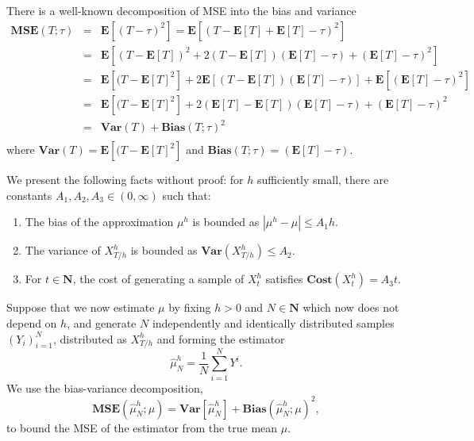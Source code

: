 \documentclass{article}
\begin{document}
There is a well-known decomposition of MSE into the bias and variance
\begin{eqnarray*}
    \mathbf{MSE}(T; \tau) & = & \mathbf{E}[(T - \tau)^2] = \mathbf{E}[(T - \mathbf{E}[T] + \mathbf{E}[T] - \tau)^2] \\
                          & = & \mathbf{E}[(T - \mathbf{E}[T])^2 + 2(T - \mathbf{E}[T])(\mathbf{E}[T] - \tau)  + (\mathbf{E}[T] - \tau)^2] \\
                          & = & \mathbf{E}[(T - \mathbf{E}[T]^2] + 2\mathbf{E}[(T - \mathbf{E}[T])(\mathbf{E}[T] - \tau)]  + \mathbf{E}[(\mathbf{E}[T] - \tau)^2] \\
                          & = & \mathbf{E}[(T - \mathbf{E}[T]^2] + 2(\mathbf{E}[T] - \mathbf{E}[T])(\mathbf{E}[T] - \tau)  + (\mathbf{E}[T] - \tau)^2 \\
                          & = & \mathbf{Var}(T) + \mathbf{Bias}(T; \tau)^2 \\
\end{eqnarray*}
where \(\mathbf{Var}(T) = \mathbf{E}[(T - \mathbf{E}[T]^2]\) and \(\mathbf{Bias}(T; \tau) = (\mathbf{E}[T] - \tau) \).

We present the following facts without proof: for \(h\) sufficiently small, there are constants \(A_1, A_2, A_3 \in (0, \infty)\) such that:
\begin{enumerate}
    \item The bias of the approximation \(\mu^h\) is bounded as \(|\mu^h - \mu| \leq A_1h\).
    \item The variance of \(X^h_{T/h}\) is bounded as \(\mathbf{Var}(X^h_{T/h}) \leq A_2\).
    \item For \(t \in \mathbf{N}\), the cost of generating a sample of \(X^h_t\) satisfies \(\mathbf{Cost}(X^h_t) = A_3t\).
\end{enumerate}

Suppose that we now estimate \(\mu\) by fixing \(h > 0\) and \(N \in \mathbf{N}\) which now does not depend on \(h\), and generate \(N\) independently and identically distributed samples \((Y_i)_{i=1}^N\), distributed as \(X^h_{T/h}\) and forming the estimator
\[ \hat\mu^h_N = \frac{1}{N}\sum_{i=1}^N Y^i. \]
We use the bias-variance decomposition,
\[ \mathbf{MSE}(\hat\mu^h_N; \mu) = \mathbf{Var}[\hat\mu^h_N] + \mathbf{Bias}(\hat\mu^h_N; \mu)^2, \]
to bound the MSE of the estimator from the true mean \(\mu\).
\end{document}
